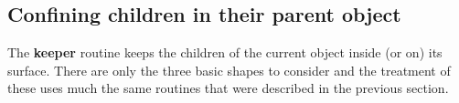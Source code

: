 \documentclass[review]{elsarticle}
\newcommand{\TT}[1]{{\ttfamily\bfseries #1}}
\begin{document}
{{{{{%
%
%


\subsection{Confining children in their parent object}

The \TT{keeper} routine keeps the children of the current object inside (or on) its
surface.  There are only the three basic shapes to consider and the treatment
of these uses much the same routines that were described in the previous section.

}}}}}
\end{document}
